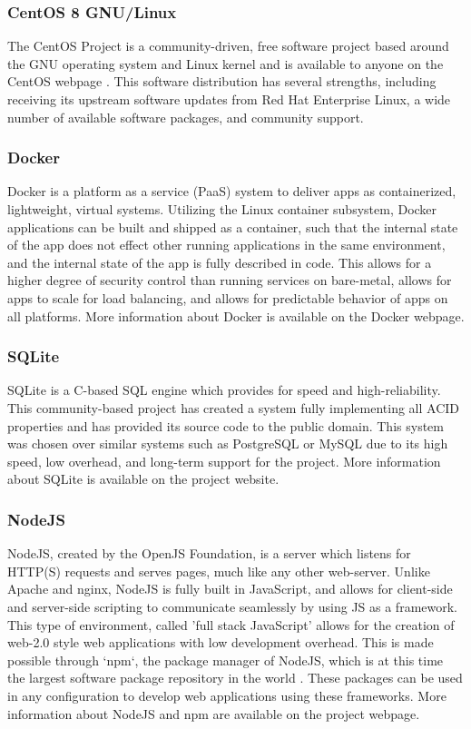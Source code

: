\documentclass[12pt, letterpaper,oneocolumn]{article}
\begin{document}
		\subsubsection{CentOS 8 GNU/Linux}
		The CentOS Project is a community-driven, free software project based around the GNU operating system and Linux kernel and is available to anyone on the CentOS webpage \cite{centos8}. This software distribution has several strengths, including receiving its upstream software updates from Red Hat Enterprise Linux, a wide number of available software packages, and community support.
		\subsubsection{Docker}
		Docker is a platform as a service (PaaS) system to deliver apps as containerized, lightweight, virtual systems. Utilizing the Linux container subsystem, Docker applications can be built and shipped as a container, such that the internal state of the app does not effect other running applications in the same environment, and the internal state of the app is fully described in code. This allows for a higher degree of security control than running services on bare-metal, allows for apps to scale for load balancing, and allows for predictable behavior of apps on all platforms. More information about Docker is available on the Docker webpage. \cite{docker}
		\subsubsection{SQLite}
		SQLite is a C-based SQL engine which provides for speed and high-reliability. This community-based project has created a system fully implementing all ACID properties and has provided its source code to the public domain. This system was chosen over similar systems such as PostgreSQL or MySQL due to its high speed, low overhead, and long-term support for the project. More information about SQLite is available on the project website. \cite{sqlite}
		\subsubsection{NodeJS}
		NodeJS, created by the OpenJS Foundation, is a server which listens for HTTP(S) requests and serves pages, much like any other web-server. Unlike Apache and nginx, NodeJS is fully built in JavaScript, and allows for client-side and server-side scripting to communicate seamlessly by using JS as a framework. This type of environment, called 'full stack JavaScript' allows for the creation of web-2.0 style web applications with low development overhead. This is made possible through `npm`, the package manager of NodeJS, which is at this time the largest software package repository in the world \cite{npm_state}. These packages can be used in any configuration to develop web applications using these frameworks.  More information about NodeJS and npm are available on the project webpage. \cite{nodejs}
\end{document}
